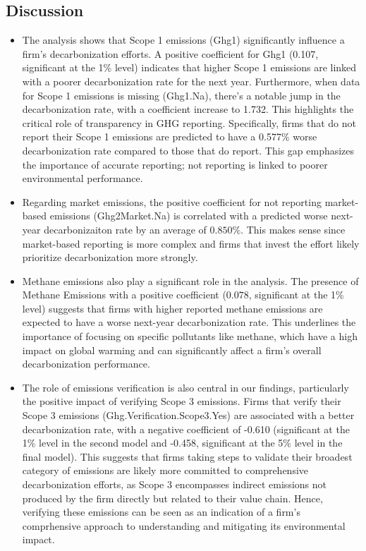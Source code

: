 \subsection{Discussion}

\begin{itemize}
    \item The analysis shows that Scope 1 emissions (Ghg1) significantly influence a firm's decarbonization efforts. A positive coefficient for Ghg1 (0.107, significant at the 1\% level) indicates that higher Scope 1 emissions are linked with a poorer decarbonization rate for the next year. Furthermore, when data for Scope 1 emissions is missing (Ghg1.Na), there's a notable jump in the decarbonization rate, with a coefficient increase to 1.732. This highlights the critical role of transparency in GHG reporting. Specifically, firms that do not report their Scope 1 emissions are predicted to have a 0.577\% worse decarbonization rate compared to those that do report. This gap emphasizes the importance of accurate reporting; not reporting is linked to poorer environmental performance.

    \item Regarding market emissions, the positive coefficient for not reporting market-based emissions (Ghg2Market.Na) is correlated with a predicted worse next-year decarbonizaiton rate by an average of $0.850 \%$. This makes sense since market-based reporting is more complex and firms that invest the effort likely prioritize decarbonization more strongly. 
    
    \item Methane emissions also play a significant role in the analysis. The presence of Methane Emissions with a positive coefficient ($0.078$, significant at the 1\% level) suggests that firms with higher reported methane emissions are expected to have a worse next-year decarbonization rate. This underlines the importance of focusing on specific pollutants like methane, which have a high impact on global warming and can significantly affect a firm's overall decarbonization performance.
    \item The role of emissions verification is also central in our findings, particularly the positive impact of verifying Scope 3 emissions. Firms that verify their Scope 3 emissions (Ghg.Verification.Scope3.Yes) are associated with a better decarbonization rate, with a negative coefficient of -0.610 (significant at the 1\% level in the second model and -0.458, significant at the 5\% level in the final model). This suggests that firms taking steps to validate their broadest category of emissions are likely more committed to comprehensive decarbonization efforts, as Scope 3 encompasses indirect emissions not produced by the firm directly but related to their value chain. Hence, verifying these emissions can be seen as an indication of a firm's comprhensive approach to understanding and mitigating its environmental impact.


\end{itemize}
